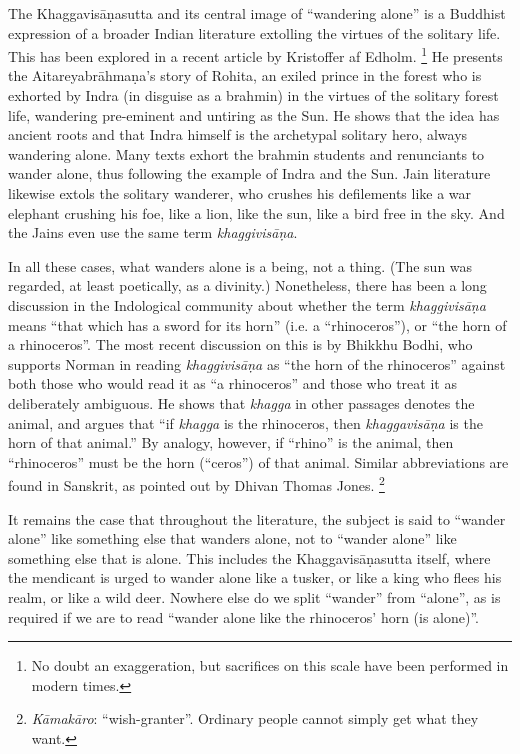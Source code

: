 \documentclass[12pt,openany]{book}%
\begin{document}
The \textsanskrit{Khaggavisāṇasutta} and its central image of “wandering alone” is a Buddhist expression of a broader Indian literature extolling the virtues of the solitary life. This has been explored in a recent article by Kristoffer af Edholm. \footnote{No doubt an exaggeration, but sacrifices on this scale have been performed in modern times. } He presents the \textsanskrit{Aitareyabrāhmaṇa}’s story of Rohita, an exiled prince in the forest who is exhorted by Indra (in disguise as a brahmin) in the virtues of the solitary forest life, wandering pre-eminent and untiring as the Sun. He shows that the idea has ancient roots and that Indra himself is the archetypal solitary hero, always wandering alone. Many texts exhort the brahmin students and renunciants to wander alone, thus following the example of Indra and the Sun. Jain literature likewise extols the solitary wanderer, who crushes his defilements like a war elephant crushing his foe, like a lion, like the sun, like a bird free in the sky. And the Jains even use the same term \textit{\textsanskrit{khaggivisāṇa}}.

In all these cases, what wanders alone is a being, not a thing. (The sun was regarded, at least poetically, as a divinity.) Nonetheless, there has been a long discussion in the Indological community about whether the term \textit{\textsanskrit{khaggivisāṇa}} means “that which has a sword for its horn” (i.e. a “rhinoceros”), or “the horn of a rhinoceros”. The most recent discussion on this is by Bhikkhu Bodhi, who supports Norman in reading \textit{\textsanskrit{khaggivisāṇa}} as “the horn of the rhinoceros” against both those who would read it as “a rhinoceros” and those who treat it as deliberately ambiguous. He shows that \textit{khagga} in other passages denotes the animal, and argues that “if \textit{khagga} is the rhinoceros, then \textit{\textsanskrit{khaggavisāṇa}} is the horn of that animal.” By analogy, however, if “rhino” is the animal, then “rhinoceros” must be the horn (“ceros”) of that animal. Similar abbreviations are found in Sanskrit, as pointed out by Dhivan Thomas Jones. \footnote{\textit{\textsanskrit{Kāmakāro}}: “wish-granter”. Ordinary people cannot simply get what they want. }

It remains the case that throughout the literature, the subject is said to “wander alone” like something else that wanders alone, not to “wander alone” like something else that is alone. This includes the \textsanskrit{Khaggavisāṇasutta} itself, where the mendicant is urged to wander alone like a tusker, or like a king who flees his realm, or like a wild deer. Nowhere else do we split “wander” from “alone”, as is required if we are to read “wander alone like the rhinoceros’ horn (is alone)”.
\end{document}
